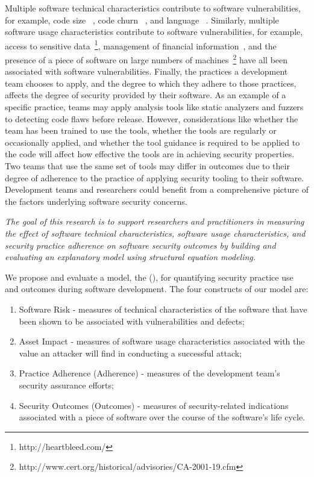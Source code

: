 Multiple software technical characteristics contribute to software vulnerabilities, for example, code size ~\cite{alhazmi2007measuring}, code churn ~\cite{shin2011evaluating,meneely2013when}, and language ~\cite{ray2014a}. Similarly, multiple software usage characteristics contribute to software vulnerabilities, for example, access to sensitive data~\footnote{http://heartbleed.com/}, management of financial information~\cite{harris2014for}, and the presence of a piece of software on large numbers of machines~\footnote{http://www.cert.org/historical/advisories/CA-2001-19.cfm} have all been associated with software vulnerabilities. Finally, the practices a development team chooses to apply, and the degree to which they adhere to those practices, affects the degree of security provided by their software. As an example of a specific practice, teams may apply analysis tools like static analyzers and fuzzers to detecting code flaws before release. However, considerations like whether the team has been trained to use the tools, whether the tools are regularly or occasionally applied, and whether the tool guidance is required to be applied to the code will affect how effective the tools are in achieving security properties.  Two teams that use the same set of tools may differ in outcomes due to their degree of adherence to the practice of applying security tooling to their software. Development teams and researchers could benefit from a comprehensive picture of the factors underlying software security concerns.

\textit{The goal of this research is to support researchers and practitioners in measuring the effect of software technical characteristics, software usage characteristics, and security practice adherence on software security outcomes by building and evaluating an explanatory model using structural equation modeling.}

We propose and evaluate a model, the \ModelName (\ModelAbbr), for quantifying security practice use and outcomes during software development. The four constructs of our model are:
\begin{enumerate}
	\item Software Risk - measures of technical characteristics of the software that have been shown to be associated with vulnerabilities and defects;	
	\item Asset Impact - measures of software usage characteristics associated with the value an attacker will find in conducting a successful attack;
	\item Practice Adherence (Adherence) - measures of the development team's security assurance efforts; 
	\item Security Outcomes (Outcomes) - measures of security-related indications associated with a piece of software over the course of the software's life cycle.
\end{enumerate}

